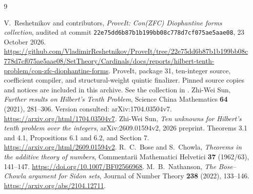 \documentclass[11pt,a4paper]{article}
\theoremstyle{remark}
\newcommand{\pin}{\texttt{22e75dd6b87b1b199bb08c778d7cf075ae5aae08}}
\begin{document}
\clearpage
\begin{thebibliography}{9}
\raggedright
{}
V.~Reshetnikov and contributors,
\emph{ProveIt: Con(ZFC) Diophantine forms collection},
audited at commit \pin, 23 October 2026.
\url{https://github.com/VladimirReshetnikov/ProveIt/tree/22e75dd6b87b1b199bb08c778d7cf075ae5aae08/SetTheory/Cardinals/docs/reports/hilbert-tenth-problem/con-zfc-diophantine-forms}.
ProveIt, package 31, ten-integer source, coefficient compiler, and
structural-weight quintic finalizer. Pinned source copies and notices
are included in this archive. See the collection in \cite{repo}.
Zhi-Wei Sun, \emph{Further results on Hilbert's Tenth Problem},
Science China Mathematics \textbf{64} (2021), 281--306.
Version consulted: arXiv:1704.03504v7.
\url{https://arxiv.org/html/1704.03504v7}.
Zhi-Wei Sun, \emph{Ten unknowns for Hilbert's tenth problem over
the integers}, arXiv:2609.01594v2, 2026 preprint.
Theorems 3.1 and 4.1, Propositions 6.1 and 6.2, and Section 7.
\url{https://arxiv.org/html/2609.01594v2}.
R.~C.~Bose and S.~Chowla, \emph{Theorems in the additive theory
of numbers}, Commentarii Mathematici Helvetici \textbf{37}
(1962/63), 141--147.
\url{https://doi.org/10.1007/BF02566968}.
M.~B.~Nathanson, \emph{The Bose--Chowla argument for Sidon sets},
Journal of Number Theory \textbf{238} (2022), 133--146.
\url{https://arxiv.org/abs/2104.12711}.
\end{thebibliography}
\end{document}
